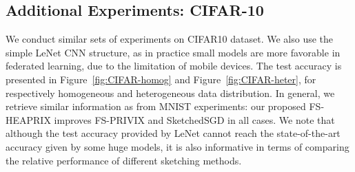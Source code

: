 \documentclass{article} %
\begin{document}
\subsection{Additional Experiments: CIFAR-10}


We conduct similar sets of experiments on CIFAR10 dataset. We also use the simple LeNet CNN structure, as in practice small models are more favorable in federated learning, due to the limitation of mobile devices. The test accuracy is presented in Figure~\ref{fig:CIFAR-homog} and Figure~\ref{fig:CIFAR-heter}, for respectively homogeneous and heterogeneous data distribution. In general, we retrieve similar information as from MNIST experiments: our proposed FS-HEAPRIX improves FS-PRIVIX and SketchedSGD in all cases. We note that although the test accuracy provided by LeNet cannot reach the state-of-the-art accuracy given by some huge models, it is also informative in terms of comparing the relative performance of different sketching methods.
\end{document}
